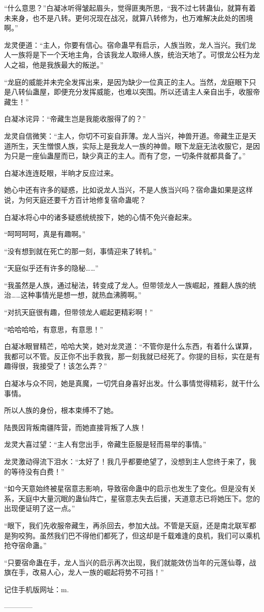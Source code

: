 \begin{this_body}
“什么意思？”白凝冰听得皱起眉头，觉得匪夷所思，“我不过七转蛊仙，就算有着未来身，也不是八转。更何况现在战况，就算八转修为，也万难解决此处的困境啊。”

龙灵便道：“主人，你要有信心。宿命蛊早有启示，人族当败，龙人当兴。我们龙人一族将是下一个天地主角，合该我龙人取缔人族，统治天地了。可恨龙公枉为龙人之祖，他是我族最大的叛逆。”

“龙庭的威能并未完全发挥出来，是因为缺少一位真正的主人。当然，龙庭眼下只是八转仙蛊屋，即便充分发挥威能，也难以突围。所以还请主人亲自出手，收服帝藏生！”

白凝冰诧异：“帝藏生岂是我能收服得了的？”

龙灵自信微笑：“主人，你切不可妄自菲薄。龙人当兴，神兽开道。帝藏生正是天道所生，天生憎恨人族，实际上是我龙人一族的神兽。眼下龙庭无法收服它，是因为只是一座仙蛊屋而已，缺少真正的主人。而有了您，一切条件就都具备了。”

白凝冰连连眨眼，半晌才反应过来。

她心中还有许多的疑惑，比如说龙人当兴，不是人族当兴吗？宿命蛊如果是这样说，为何天庭还要千方百计地修复宿命蛊呢？

白凝冰将心中的诸多疑惑统统按下，她的心情不免兴奋起来。

“呵呵呵呵，真是有趣啊。”

“没有想到就在死亡的那一刻，事情迎来了转机。”

“天庭似乎还有许多的隐秘……”

“我虽然是人族，通过秘法，转变成了龙人。但带领龙人一族崛起，推翻人族的统治……这种事情光是想一想，就热血沸腾啊。”

“对抗天庭很有趣，但带领龙人崛起更精彩啊！”

“哈哈哈哈，有意思，有意思！”

白凝冰眼冒精芒，哈哈大笑，她对龙灵道：“不管你是什么东西，有着什么谋算，我都可以不管。反正你不出手救我，那一刻我就已经死了。你提的目标，实在是有趣得很，我接受了！该怎么弄？”

白凝冰与众不同，她是真魔，一切凭自身喜好出发。什么事情觉得精彩，就干什么事情。

所以人族的身份，根本束缚不了她。

陆畏因背叛南疆阵营，而她直接背叛了人族！

龙灵大喜过望：“主人有您出手，帝藏生臣服是轻而易举的事情。”

龙灵激动得流下泪水：“太好了！我几乎都要绝望了，没想到主人您终于来了，我的等待没有白费！”

“如今天意始终被星宿意志影响，导致宿命蛊中的启示也发生了变化。但是没有关系，天庭中大量沉眠的蛊仙阵亡，星宿意志失去后援，天道意志已将她压下。您的出现便证明了这一点。”

“眼下，我们先收服帝藏生，再杀回去，参加大战。不管是天庭，还是南北联军都是狗咬狗。虽然我们巴不得他们都死了，但这却是千载难逢的良机，我们可以乘机抢夺宿命蛊。”

“只要宿命蛊在手，龙人当兴的启示再次出现，我们就能效仿当年的元莲仙尊，战旗在手，改易人心，龙人一族的崛起将势不可挡！”

记住手机版网址：m.

------------

\end{this_body}

